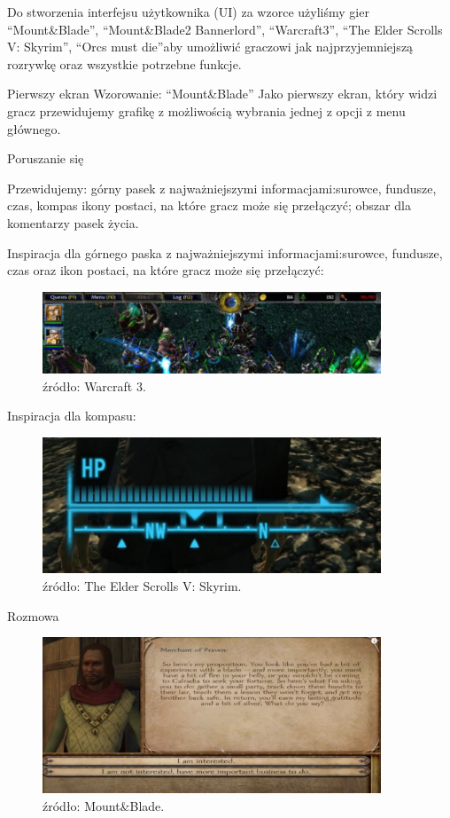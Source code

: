 Do stworzenia interfejsu użytkownika (UI) za wzorce użyliśmy gier “Mount&Blade”, “Mount&Blade2 Bannerlord”, “Warcraft3”, “The Elder Scrolls V: Skyrim”, “Orcs must die”aby umożliwić graczowi jak najprzyjemniejszą rozrywkę oraz wszystkie potrzebne funkcje.

Pierwszy ekran
Wzorowanie: “Mount&Blade”
Jako pierwszy ekran, który widzi gracz przewidujemy grafikę z możliwością wybrania jednej z opcji z menu głównego.

Poruszanie się

Przewidujemy:
górny pasek z najważniejszymi informacjami:surowce, fundusze, czas, kompas
ikony postaci, na które gracz może się przełączyć;
obszar dla komentarzy
pasek życia.

Inspiracja dla górnego paska z najważniejszymi informacjami:surowce, fundusze, czas oraz ikon postaci, na które gracz może się przełączyć:
\begin{figure}[htbp]
    \centering
    \includegraphics[width=0.9\textwidth]{images/ui/warcraft3.png}
    \caption{źródło: Warcraft 3.}\label{fig:Warcraft3}
\end{figure}

Inspiracja dla kompasu:
\begin{figure}[htbp]
    \centering
    \includegraphics[width=0.9\textwidth]{images/ui/compassSkyrim.png}
    \caption{źródło: The Elder Scrolls V: Skyrim.}\label{fig:Skyrim}
\end{figure}

Rozmowa 
\begin{figure}[htbp]
    \centering
    \includegraphics[width=0.9\textwidth]{images/ui/conversationMnB.png}
    \caption{źródło: Mount&Blade.}\label{fig:MountnBlade}
\end{figure}

